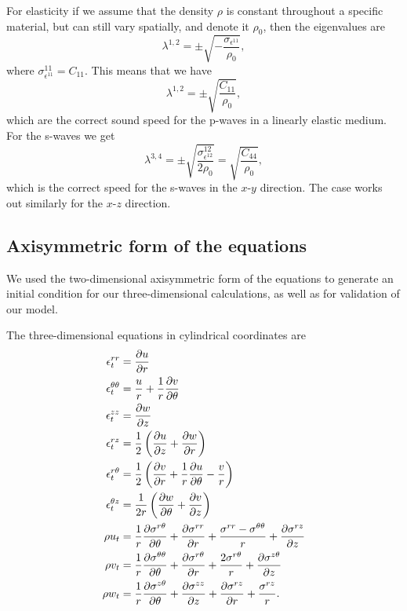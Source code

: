 \documentclass{article}
\begin{document}
{For elasticity if we assume that the density $\rho$ is constant throughout a specific material, but can still 
vary spatially, and denote it $\rho_0$, then the eigenvalues are\\
\begin{equation}
\lambda^{1,2} = \pm \sqrt{-\frac{\sigma_{\epsilon^{11}}}{\rho_0}},
\end{equation}
where $\sigma^{11}_{\epsilon^{11}} = C_{11}$.  
This means that we have
\begin{equation}
\lambda^{1,2} = \pm \sqrt{\frac{C_{11}}{\rho_0}},
\end{equation}
which are the correct sound speed for the p-waves in a linearly elastic medium.  For the s-waves we get
\begin{equation}
\lambda^{3,4} = \pm \sqrt{\frac{\sigma^{12}_{\epsilon^{12}}}{2\rho_0}} = \sqrt{\frac{C_{44}}{\rho_0}},
\end{equation}
which is the correct speed for the s-waves in the $x$-$y$ direction.  The case works
out similarly for the $x$-$z$ direction. 
}


\subsection{Axisymmetric form of the equations}
\label{sec:axisym}
We used the two-dimensional axisymmetric form of the equations to generate an initial condition for our 
three-dimensional calculations, as well as for validation of our model.  

The three-dimensional equations in cylindrical coordinates are
\begin{align}
\epsilon^{rr}_t &= \frac{\partial u}{\partial r}\notag\\
\epsilon^{\theta \theta}_t &= \frac{u}{r} + \frac{1}{r} \frac{\partial v}{\partial \theta}\notag\\
\epsilon^{zz}_t &= \frac{\partial w}{\partial z}\notag\\
\epsilon^{rz}_t &= \frac{1}{2} \left(\frac{\partial u}{\partial z} + \frac{\partial w}{\partial r}\right)\notag\\
\epsilon^{r \theta}_t &= \frac{1}{2} \left(\frac{\partial v}{\partial r} + \frac{1}{r} \frac{\partial u}{\partial \theta} - 
\frac{v}{r}\right)\notag\\
\epsilon^{\theta z}_t &= \frac{1}{2r}\left( \frac{\partial w}{\partial \theta} + \frac{\partial v}{\partial z}\right)\label{eqn:3dcyllageul}\\
\rho u_t &= \frac{1}{r} \frac{\partial \sigma^{r \theta}}{\partial \theta} + \frac{\partial \sigma^{rr}}{\partial r} + 
\frac{\sigma^{rr} - \sigma^{\theta \theta}}{r} + \frac{\partial \sigma^{rz}}{\partial z}\notag\\
\rho v_t &= \frac{1}{r} \frac{\partial \sigma^{\theta \theta}}{\partial \theta} + \frac{\partial \sigma^{r \theta}}
{\partial r} + \frac{2 \sigma^{r \theta}}{r} + \frac{\partial \sigma^{z \theta}}{\partial z}\notag \\
\rho w_t &= \frac{1}{r} \frac{\partial \sigma^{z \theta}}{\partial \theta} + \frac{\partial \sigma^{zz}}{\partial z} 
+ \frac{\partial \sigma^{rz}}{\partial r} + \frac{\sigma^{rz}}{r}.\notag
\end{align}
\end{document}
